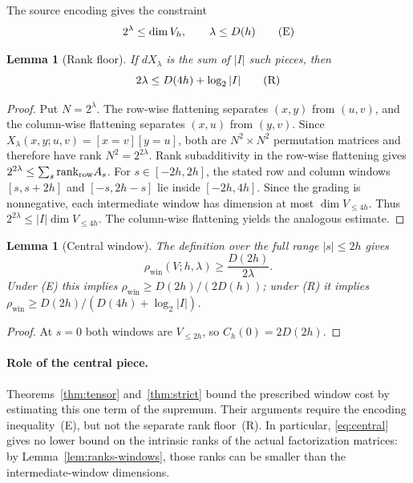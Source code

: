 \documentclass[10pt,a4paper]{article}
\numberwithin{equation}{section}
\newtheorem{lemma}[theorem]{Lemma}\newtheorem{proposition}[theorem]{Proposition}
\theoremstyle{remark}\newtheorem{remark}[theorem]{Remark}\newtheorem{question}[theorem]{Question}
\newcommand{\rhow}{\rho_{\mathrm{win}}}\newcommand{\F}{\mathbb F}\newcommand{\K}{\mathbb K}\newcommand{\Z}{\mathbb Z}\newcommand{\R}{\mathbb R}\newcommand{\cB}{\mathcal L}\newcommand{\wt}{\mathrm{wt}}\newcommand{\dimn}{\operatorname{dim}}\newcommand{\supp}{\operatorname{supp}}
\begin{document}
The source encoding gives the constraint
\[2^\lambda\le\dimn V_h,\qquad \lambda\le D(h)\qquad\textup{(E)}\]
\begin{lemma}[Rank floor]\label{lem:rankfloor}
If $dX_\lambda$ is the sum of $|I|$ such pieces, then
\[2\lambda\le D(4h)+\log_2|I|\qquad\textup{(R)}\]
\end{lemma}
\begin{proof}Put $N=2^\lambda$. The row-wise flattening separates $(x,y)$ from $(u,v)$, and the column-wise flattening separates $(x,u)$ from $(y,v)$. Since $X_\lambda(x,y;u,v)=[x=v][y=u]$, both are $N^2\times N^2$ permutation matrices and therefore have rank $N^2=2^{2\lambda}$. Rank subadditivity in the row-wise flattening gives $2^{2\lambda}\le\sum_s\mathrm{rank}_{\rm row}A_s$. For $s\in[-2h,2h]$, the stated row and column windows $[s,s+2h]$ and $[-s,2h-s]$ lie inside $[-2h,4h]$. Since the grading is nonnegative, each intermediate window has dimension at most $\dimn V_{\le4h}$. Thus $2^{2\lambda}\le|I|\dimn V_{\le4h}$. The column-wise flattening yields the analogous estimate.\end{proof}
\begin{lemma}[Central window]\label{lem:central}
The definition over the \emph{full} range $|s|\le2h$ gives
\begin{equation}\label{eq:central}\rhow(V;h,\lambda)\ge\frac{D(2h)}{2\lambda}.\end{equation}
Under (E) this implies $\rhow\ge D(2h)/(2D(h))$; under (R) it implies $\rhow\ge D(2h)/(D(4h)+\log_2|I|)$.
\end{lemma}
\begin{proof}At $s=0$ both windows are $V_{\le2h}$, so $C_h(0)=2D(2h)$.\end{proof}
\paragraph{Role of the central piece.}
Theorems~\ref{thm:tensor} and~\ref{thm:strict} bound the prescribed window cost by estimating this one term of the supremum. Their arguments require the encoding inequality~\textup{(E)}, but not the separate rank floor~\textup{(R)}. In particular, \eqref{eq:central} gives no lower bound on the intrinsic ranks of the actual factorization matrices: by Lemma~\ref{lem:ranks-windows}, those ranks can be smaller than the intermediate-window dimensions.
\end{document}
